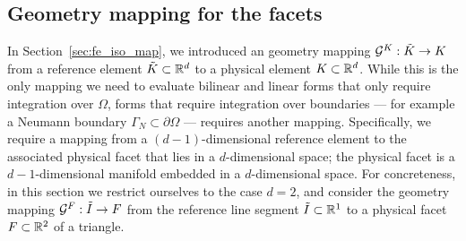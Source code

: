\subsection{Geometry mapping for the facets}
In Section~\ref{sec:fe_iso_map}, we introduced an geometry mapping $\mathcal{G}^K: \tilde K \to K$ from a reference element $\tilde K \subset \mathbb{R}^d$ to a physical element $K \subset \mathbb{R}^d$.  While this is the only mapping we need to evaluate bilinear and linear forms that only require integration over $\Omega$, forms that require integration over boundaries --- for example a Neumann boundary $\Gamma_N \subset \partial \Omega$ --- requires another mapping. Specifically, we require a mapping from a $(d-1)$-dimensional reference element to the associated physical facet that lies in a $d$-dimensional space; the physical facet is a $d-1$-dimensional manifold embedded in a $d$-dimensional space.  For concreteness, in this section we restrict ourselves to the case $d=2$, and consider the geometry mapping $\mathcal{G}^F: \tilde I \to F$ from the reference line segment $\tilde I \subset \mathbb{R}^1$ to a physical facet $F \subset \mathbb{R}^2$ of a triangle.

